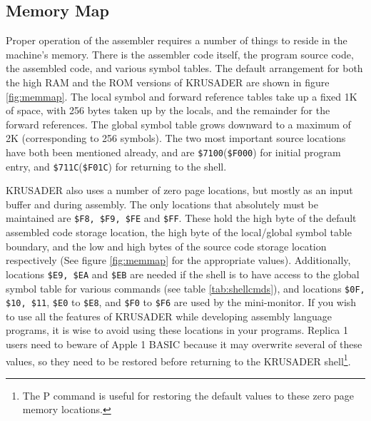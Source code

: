 \documentclass[12pt]{article}
\newcommand{\replica}[1]{\textsf{#1}}
\newcommand{\krusader}{\textsf{KRUSADER}\xspace}
\begin{document}
\subsection{Memory Map}
\label{sec:memory}

Proper operation of the assembler requires a number of things to reside in the machine's memory.
There is the assembler code itself, the program source code, the assembled code, and various
symbol tables.  The default arrangement for both the high RAM and the ROM versions of \krusader
are shown in figure \ref{fig:memmap}.  The local symbol and forward reference tables take up a
fixed 1K of space, with 256 bytes taken up by the locals, and the remainder for the forward references.
The global symbol table grows downward to a maximum of 2K (corresponding to 256 symbols).  
The two most important source locations have both been mentioned already, and are \texttt{\$7100}(\texttt{\$F000}) 
for initial program entry, and \texttt{\$711C}(\texttt{\$F01C}) for returning to the shell.

\krusader also
uses a number of zero page locations, but mostly as an input buffer and during assembly.  The only
locations that absolutely must be maintained are \texttt{\$F8, \$F9, \$FE} and \texttt{\$FF}.  These hold
the high byte of the default assembled code storage location, the high byte of the local/global
symbol table boundary, and the low and high bytes of the source code storage location respectively
(See figure \ref{fig:memmap} for the appropriate values).
Additionally, locations \texttt{\$E9, \$EA} and \texttt{\$EB} are needed if the shell is to have access to the global symbol
table for various commands (see table \ref{tab:shellcmds}), and locations \texttt{\$0F, \$10, \$11}, \texttt{\$E0} to \texttt{\$E8},
and \texttt{\$F0} to \texttt{\$F6} are used by the mini-monitor. If you wish to use all the features of
\krusader while developing assembly language programs, it is wise to avoid using these locations in your programs.
Replica 1 users need to beware of Apple 1 BASIC because it may overwrite several of these values, so they need to 
be restored before returning to the \krusader shell\footnote{The \replica{P} command is useful 
for restoring the default values to these zero page memory locations.}.  
\end{document}
